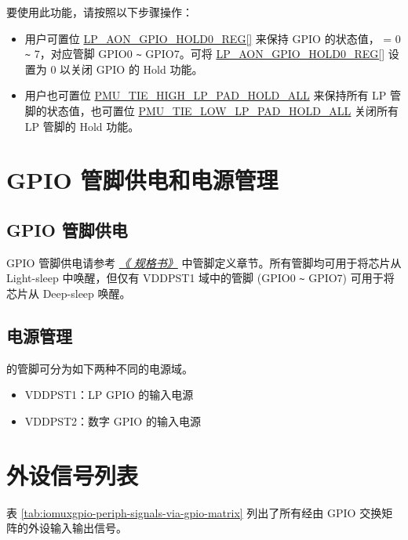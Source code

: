 \documentclass[main\_\_CN.tex]{subfiles}
\begin{document}
\begin{itemize}
要使用此功能，请按照以下步骤操作：
\begin{itemize}
    \item 用户可置位 \hyperref[regdesc:LPAONGPIOHOLD0REG]{LP\_AON\_GPIO\_HOLD0\_REG[]} 来保持 GPIO 的状态值， = 0 \verb+~+ 7，对应管脚 GPIO0 \verb+~+ GPIO7。可将 \hyperref[regdesc:LPAONGPIOHOLD0REG]{LP\_AON\_GPIO\_HOLD0\_REG[]} 设置为 0 以关闭 GPIO 的 Hold 功能。
    \item 用户也可置位 \hyperref[fielddesc:PMUTIEHIGHLPPADHOLDALL]{PMU\_TIE\_HIGH\_LP\_PAD\_HOLD\_ALL} 来保持所有 LP 管脚的状态值，也可置位 \hyperref[fielddesc:PMUTIELOWLPPADHOLDALL]{PMU\_TIE\_LOW\_LP\_PAD\_HOLD\_ALL} 关闭所有 LP 管脚的 Hold 功能。
\end{itemize}
\end{itemize}


\section{GPIO 管脚供电和电源管理}\label{I/O Pad Power Supplies}

\subsection{GPIO 管脚供电}
GPIO 管脚供电请参考  {\it{\href{https://www.espressif.com/sites/default/files/documentation/esp32-c6_datasheet_en.pdf}{《\chipname{} 规格书》}}} 中管脚定义章节。所有管脚均可用于将芯片从 Light-sleep 中唤醒，但仅有 VDDPST1 域中的管脚 (GPIO0 \verb+~+ GPIO7) 可用于将芯片从 Deep-sleep 唤醒。

\subsection{电源管理}

\chipname{} 的管脚可分为如下两种不同的电源域。

\begin{itemize}
    \item VDDPST1：LP GPIO 的输入电源
    \item VDDPST2：数字 GPIO 的输入电源
\end{itemize}

\section{外设信号列表}
\label{sec:peripheral_signals}

表 \ref{tab:iomuxgpio-periph-signals-via-gpio-matrix} 列出了所有经由 GPIO 交换矩阵的外设输入输出信号。
\end{document}
